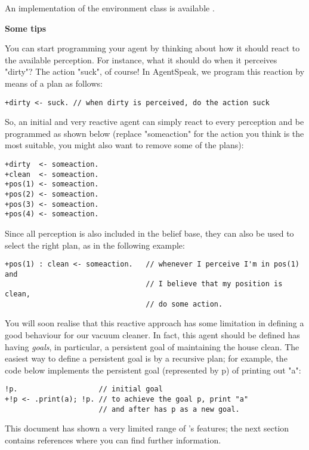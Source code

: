 \documentclass[a4paper]{article}
\newcommand{\Jason}[0]{\htlink{\textit{\textbf{Jason}}}{http://jason.sf.net}\xspace}
\begin{document}
An implementation of the environment class is available
.


\textbf{Some tips}

You can start programming your agent by thinking about how it should
react to the available perception. For instance, what it should do
when it perceives "dirty"? The action "suck", of course! In AgentSpeak,
we program this reaction by means of a plan as follows:

\begin{verbatim}
+dirty <- suck. // when dirty is perceived, do the action suck
\end{verbatim}

So, an initial and very reactive agent can simply react to every
perception and be programmed as shown below (replace "someaction" for
the action you think is the most suitable, you might also want to
remove some of the plans):

\begin{verbatim}
+dirty  <- someaction.
+clean  <- someaction.
+pos(1) <- someaction.
+pos(2) <- someaction.
+pos(3) <- someaction.
+pos(4) <- someaction.
\end{verbatim}

Since all perception is also included in the belief base, they can
also be used to select the right plan, as in the following example:

\begin{verbatim}
+pos(1) : clean <- someaction.   // whenever I perceive I'm in pos(1) and
                                 // I believe that my position is clean, 
                                 // do some action.
\end{verbatim}


You will soon realise that this reactive approach has some limitation
in defining a good behaviour for our vacuum cleaner. In fact, this agent
should be defined has having \emph{goals}, in particular, a persistent
goal of maintaining the house clean. The easiest way to define a
persistent goal is by a recursive plan; for example, the code below
implements the persistent goal (represented by p) of printing out "a":

\begin{verbatim}
!p.                   // initial goal
+!p <- .print(a); !p. // to achieve the goal p, print "a" 
                      // and after has p as a new goal.
\end{verbatim}


This document has shown a very limited range of \Jason's features; the
next section contains references where you can find further
information.
\end{document}
